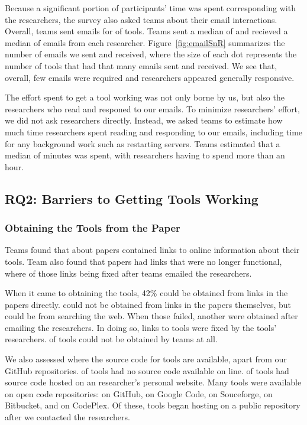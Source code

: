 \documentclass[10pt,conference]{IEEEtran}
\begin{document}
Because a significant portion of participants' time was
spent corresponding with the researchers,
the survey also asked teams about their email interactions.
Overall, teams sent emails for \emailsPercentSent of tools.
Teams sent a median of \emailsSent and recieved 
a median of \emailsRecieved emails from each researcher.
Figure~\ref{fig:emailSnR} summarizes the number of emails
we sent and received, where the size of each dot
represents the number of tools that had
that many emails sent and received.
We see that, overall, few emails were required
and researchers appeared generally responsive.

The effort spent to get a tool working was not only
borne by us, but also the researchers who 
read and responed to our emails.
To minimize researchers' effort, we did not ask researchers directly.
Instead, we asked teams to estimate how much time researchers spent 
reading and responding to our emails, including time for 
any background work such as restarting servers.
Teams estimated that a median of \durationAuthorResponse minutes 
was spent, with \durationAuthorResponseCountHigh researchers having
to spend more than an hour.

\subsection{RQ2: Barriers to Getting Tools Working}

\subsubsection{Obtaining the Tools from the Paper}

Teams found that about \papersWithLinks papers
contained links to online information about their tools.
Team also found that \papersWithLinksDead papers
had links that were no longer functional,
where \papersWithLinksRevived of those links
being fixed after teams emailed the researchers.

When it came to obtaining the tools, 42\%
could be obtained from links in 
the papers directly.
\obtainGoogle could not be obtained from
links in the papers themselves, but could be
from searching the web.
When those failed, another \obtainEmail were 
obtained after emailing the researchers.
In doing so, \contactFixLink links to tools 
were fixed by the tools' researchers.
\obtainNot of tools could not be obtained
by teams at all.

We also assessed where the source code for tools are available,
apart from our GitHub repositories.
\onlineNotAvail of tools had no source code available 
on line.
\onlinePersonalSite of tools had source code hosted
on an researcher's personal website.
Many tools were available on open code repositories:
\onlineGitHub on GitHub, 
\onlineGcode on Google Code,
\onlineSourceforge on Souceforge,
\onlineBitbucket on Bitbucket,
and \onlineCodeplex on CodePlex.
Of these, \contactHosted tools began hosting 
on a public repository after
we contacted the researchers.
\end{document}

